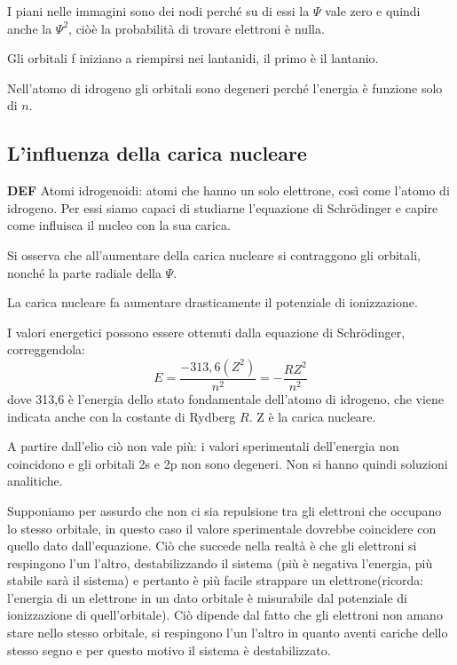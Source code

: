 I piani nelle immagini sono dei nodi perché su di essi la $\Psi$ vale zero e quindi anche la $\Psi^2$, ciòè la probabilità di trovare elettroni è nulla.

Gli orbitali f iniziano a riempirsi nei lantanidi, il primo è il lantanio.

Nell'atomo di idrogeno gli orbitali sono degeneri perché l'energia è funzione solo di $n$.
\subsection{L'influenza della carica nucleare}
\textbf{DEF} Atomi idrogenoidi: atomi che hanno un solo elettrone, così come l'atomo di idrogeno. Per essi siamo capaci di studiarne l'equazione di Schrödinger e capire come influisca il nucleo con la sua carica.

Si osserva che all'aumentare della carica nucleare si contraggono gli orbitali, nonché la parte radiale della $\Psi$.

La carica nucleare fa aumentare drasticamente il potenziale di ionizzazione.

I valori energetici possono essere ottenuti dalla equazione di Schrödinger, correggendola:
$$E=\frac{-313,6(Z^2)}{n^2}=-\frac{RZ^2}{n^2}$$
dove 313,6 è l'energia dello stato fondamentale dell'atomo di idrogeno, che viene indicata anche con la costante di Rydberg $R$. Z è la carica nucleare.

A partire dall'elio ciò non vale più: i valori sperimentali dell'energia non coincidono e gli orbitali 2s e 2p non sono degeneri. Non si hanno quindi soluzioni analitiche.

Supponiamo per assurdo che non ci sia repulsione tra gli elettroni che occupano lo stesso orbitale, in questo caso il valore sperimentale dovrebbe coincidere con quello dato dall'equazione. Ciò che succede nella realtà è che gli elettroni si respingono l'un l'altro, destabilizzando il sistema (più è negativa l'energia, più stabile sarà il sistema) e pertanto è più facile strappare un elettrone(ricorda: l'energia di un elettrone in un dato orbitale è misurabile dal potenziale di ionizzazione di quell'orbitale). Ciò dipende dal fatto che gli elettroni non amano stare nello stesso orbitale, si respingono l'un l'altro in quanto aventi cariche dello stesso segno e per questo motivo il sistema è destabilizzato.

